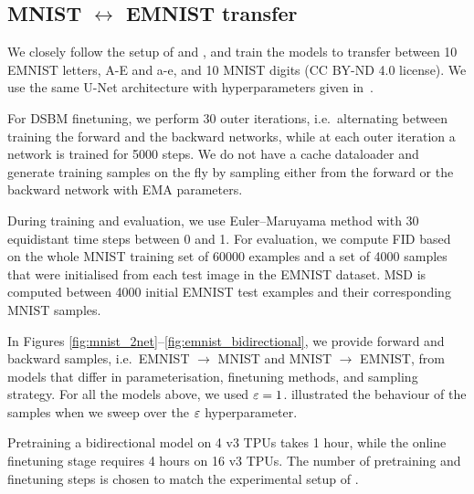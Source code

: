 \documentclass{article}
\begin{document}
\subsection{MNIST $\leftrightarrow$ EMNIST transfer}
\label{sec:experimental_details_mnist}

We closely follow the setup of \cite{shi2023DSBM} and \cite{debortoli2021diffusion}, and train the models to transfer between 10 EMNIST letters, A-E and a-e, and 10 MNIST digits (CC BY-ND 4.0 license). We use the same U-Net architecture with hyperparameters given in~. 

For DSBM finetuning, we perform 30 outer iterations, i.e.~alternating between training the forward and the backward networks, while at each outer iteration a network is trained for 5000 steps. We do not have a cache dataloader and generate training samples on the fly by sampling either from the forward or the backward network with EMA parameters. 

During training and evaluation, we use Euler–Maruyama method with 30 equidistant time steps between 0 and 1. For evaluation, we compute FID based on the whole MNIST training set of 60000 examples and a set of 4000 samples that were initialised from each test image in the EMNIST dataset. MSD is computed between 4000 initial EMNIST test examples and their corresponding MNIST samples.  

In Figures \ref{fig:mnist_2net}--\ref{fig:emnist_bidirectional}, we provide forward and backward samples, i.e.~EMNIST $\rightarrow$ MNIST and MNIST $\rightarrow$ EMNIST, from models that differ in parameterisation, finetuning methods, and sampling strategy. For all the models above, we used $\varepsilon=1$.  illustrated the behaviour of the samples when we sweep over the $\varepsilon$ hyperparameter.   

Pretraining a bidirectional model on 4 v3 TPUs takes 1 hour, while the online finetuning stage requires 4 hours on 16 v3 TPUs. The number of pretraining and finetuning steps is chosen to match the experimental setup of \cite{shi2023DSBM}. 
\end{document}
